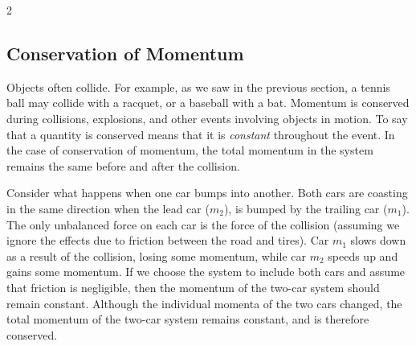 \documentclass{article}
\numberwithin{equation}{section}
\numberwithin{figure}{section}
\begin{document}
\begin{multicols}{2}




\end{multicols}

\subsection{Conservation of Momentum} \label{HnP5Pm}
Objects often collide. For example, as we saw in the previous section, a tennis ball may collide with a racquet, or a baseball with a bat. Momentum is conserved during collisions, explosions, and other events involving objects in motion. To say that a quantity is conserved means that it is \textit{constant} throughout the event. In the case of conservation of momentum, the total momentum in the system remains the same before and after the collision.
\vspace{1em}

Consider what happens when one car bumps into another. Both cars are coasting in the same direction when the lead car ($m_2$), is bumped by the trailing car ($m_1$). The only unbalanced force on each car is the force of the collision (assuming we ignore the effects due to friction between the road and tires). Car $m_1$ slows down as a result of the collision, losing some momentum, while car $m_2$ speeds up and gains some momentum. If we choose the system to include both cars and assume that friction is negligible, then the momentum of the two-car system should remain constant. Although the individual momenta of the two cars changed, the total momentum of the two-car system remains constant, and is therefore conserved.
\vspace{1em}
\end{document}
